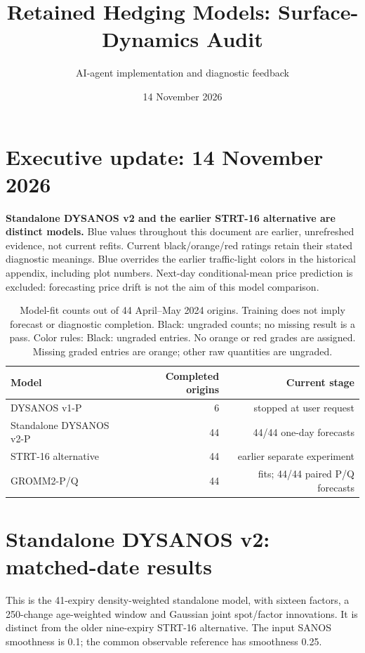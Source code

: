 \documentclass[11pt]{article}
\title{Retained Hedging Models: Surface-Dynamics Audit}
\author{AI-agent implementation and diagnostic feedback}
\date{14 November 2026}
\begin{document}
\maketitle
\section*{Executive update: 14 November 2026}

\textbf{Standalone DYSANOS v2 and the earlier STRT-16 alternative are distinct models.} Blue values throughout this document are earlier, unrefreshed evidence, not current refits. Current black/orange/red ratings retain their stated diagnostic meanings. Blue overrides the earlier traffic-light colors in the historical appendix, including plot numbers. Next-day conditional-mean price prediction is excluded: forecasting price drift is not the aim of this model comparison.

\begin{table}[H]\centering\small\setlength{\tabcolsep}{4pt}
\caption{Model-fit counts out of 44 April--May 2024 origins. Training does not imply forecast or diagnostic completion. Black: ungraded counts; no missing result is a pass. Color rules: Black: ungraded entries. No orange or red grades are assigned. Missing graded entries are orange; other raw quantities are ungraded.}\label{tab:current-coverage}
\begin{tabular}{@{}lrr@{}}
\toprule
Model & Completed origins & Current stage \\
\midrule
DYSANOS v1-P & 6 & stopped at user request \\
Standalone DYSANOS v2-P & 44 & 44/44 one-day forecasts \\
STRT-16 alternative & 44 & earlier separate experiment \\
GROMM2-P/Q & 44 & fits; 44/44 paired P/Q forecasts \\
\bottomrule\end{tabular}\end{table}

\section{Standalone DYSANOS v2: matched-date results}

This is the 41-expiry density-weighted standalone model, with sixteen factors, a 250-change age-weighted window and Gaussian joint spot/factor innovations. It is distinct from the older nine-expiry STRT-16 alternative. The input SANOS smoothness is 0.1; the common observable reference has smoothness 0.25.
\end{document}
